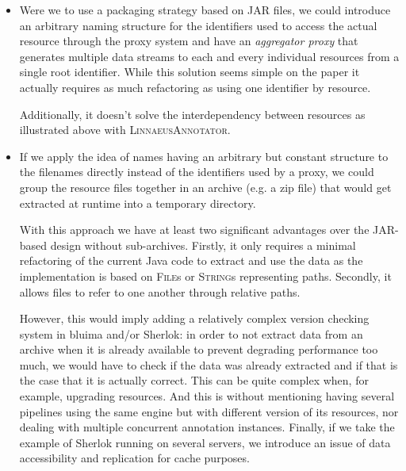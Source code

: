 \documentclass{article}
\newcommand{\ID}[1]{{\textsc{#1}}}
\newcommand{\JAR}{JAR\xspace}
\begin{document}
\begin{itemize}

    \item Were we to use a packaging strategy based on \JAR files, we could introduce an arbitrary
        naming structure for the identifiers used to access the actual resource through the proxy
        system and have an \emph{aggregator proxy} that generates multiple data streams to each and
        every individual resources from a single root identifier. While this solution seems simple
        on the paper it actually requires as much refactoring as using one identifier by resource.

        Additionally, it doesn't solve the interdependency between resources as illustrated above
        with \ID{LinnaeusAnnotator}.

    \item If we apply the idea of names having an arbitrary but constant structure to the filenames
        directly instead of the identifiers used by a proxy, we could group the resource files
        together in an archive (e.g. a zip file) that would get extracted at runtime into a
        temporary directory.

        With this approach we have at least two significant advantages over the \JAR-based design
        without sub-archives. Firstly, it only requires a minimal refactoring of the current Java
        code to extract and use the data as the implementation is based on \ID{File}s or
        \ID{String}s representing paths. Secondly, it allows files to refer to one another through
        relative paths.

        However, this would imply adding a relatively complex version checking system in bluima
        and/or Sherlok: in order to not extract data from an archive when it is already available to
        prevent degrading performance too much, we would have to check if the data was already
        extracted and if that is the case that it is actually correct. This can be quite complex
        when, for example, upgrading resources. And this is without mentioning having several
        pipelines using the same engine but with different version of its resources, nor dealing
        with multiple concurrent annotation instances. Finally, if we take the example of Sherlok
        running on several servers, we introduce an issue of data accessibility and replication for
        cache purposes.

\end{itemize}
\end{document}
